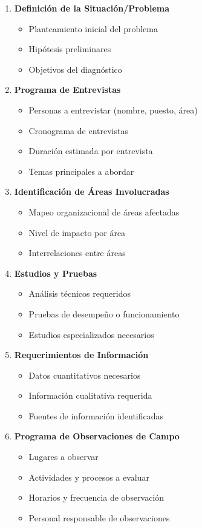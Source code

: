 \documentclass[12pt,letterpaper,oneside]{book}
\begin{document}
\begin{enumerate}
\item \textbf{Definición de la Situación/Problema}
   \begin{itemize}
   \item Planteamiento inicial del problema
   \item Hipótesis preliminares
   \item Objetivos del diagnóstico
   \end{itemize}

\item \textbf{Programa de Entrevistas}
   \begin{itemize}
   \item Personas a entrevistar (nombre, puesto, área)
   \item Cronograma de entrevistas
   \item Duración estimada por entrevista
   \item Temas principales a abordar
   \end{itemize}

\item \textbf{Identificación de Áreas Involucradas}
   \begin{itemize}
   \item Mapeo organizacional de áreas afectadas
   \item Nivel de impacto por área
   \item Interrelaciones entre áreas
   \end{itemize}

\item \textbf{Estudios y Pruebas}
   \begin{itemize}
   \item Análisis técnicos requeridos
   \item Pruebas de desempeño o funcionamiento
   \item Estudios especializados necesarios
   \end{itemize}

\item \textbf{Requerimientos de Información}
   \begin{itemize}
   \item Datos cuantitativos necesarios
   \item Información cualitativa requerida
   \item Fuentes de información identificadas
   \end{itemize}

\item \textbf{Programa de Observaciones de Campo}
   \begin{itemize}
   \item Lugares a observar
   \item Actividades y procesos a evaluar
   \item Horarios y frecuencia de observación
   \item Personal responsable de observaciones
   \end{itemize}


\end{enumerate}
\end{document}
